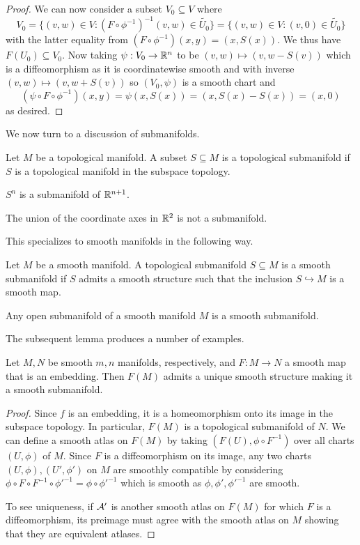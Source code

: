 \begin{proof}
    We can now consider a subset $V_{0}\subseteq V$ where 
    $$V_{0}=\{(v,w)\in V:(F\circ\phi^{-1})^{-1}(v,w)\in\widetilde{U_{0}}\}=\{(v,w)\in V:(v,0)\in\widetilde{U_{0}}\}$$
    with the latter equality from $(F\circ\phi^{-1})(x,y)=(x,S(x))$. We thus have $F(U_{0})\subseteq V_{0}$. Now taking $\psi:V_{0}\to\mathbb{R}^{n}$ to be $(v,w)\mapsto(v, w-S(v))$ which is a diffeomorphism as it is coordinatewise smooth and with inverse $(v,w)\mapsto(v,w+S(v))$ so $(V_{0},\psi)$ is a smooth chart and 
    $$(\psi\circ F\circ\phi^{-1})(x,y) = \psi(x, S(x)) = (x,S(x)-S(x))=(x,0)$$
    as desired.
\end{proof}
We now turn to a discussion of submanifolds. 
\begin{definition}[Submanifold]\label{def: submanifold}
    Let $M$ be a topological manifold. A subset $S\subseteq M$ is a topological submanifold if $S$ is a topological manifold in the subspace topology. 
\end{definition}
\begin{example}
    $S^{n}$ is a submanifold of $\mathbb{R}^{n+1}$. 
\end{example}
\begin{example}
    The union of the coordinate axes in $\mathbb{R}^{2}$ is not a submanifold. 
\end{example}
This specializes to smooth manifolds in the following way. 
\begin{definition}\label{def: smooth submanifold}
    Let $M$ be a smooth manifold. A topological submanifold $S\subseteq M$ is a smooth submanifold if $S$ admits a smooth structure such that the inclusion $S\hookrightarrow M$ is a smooth map. 
\end{definition}
\begin{remark}
    Any open submanifold of a smooth manifold $M$ is a smooth submanifold. 
\end{remark}
The subsequent lemma produces a number of examples. 
\begin{lemma}\label{lem: smooth submanifold recipe}
    Let $M,N$ be smooth $m,n$ manifolds, respectively, and $F:M\to N$ a smooth map that is an embedding. Then $F(M)$ admits a unique smooth structure making it a smooth submanifold. 
\end{lemma}
\begin{proof}
    Since $f$ is an embedding, it is a homeomorphism onto its image in the subspace topology. In particular, $F(M)$ is a topological submanifold of $N$. We can define a smooth atlas on $F(M)$ by taking $(F(U),\phi\circ F^{-1})$ over all charts $(U,\phi)$ of $M$. Since $F$ is a diffeomorphism on its image, any two charts $(U,\phi),(U',\phi')$ on $M$ are smoothly compatible by considering $\phi\circ F\circ F^{-1}\circ\phi'^{-1}=\phi\circ\phi'^{-1}$ which is smooth as $\phi,\phi',\phi'^{-1}$ are smooth.

    To see uniqueness, if $\mathcal{A}'$ is another smooth atlas on $F(M)$ for which $F$ is a diffeomorphism, its preimage must agree with the smooth atlas on $M$ showing that they are equivalent atlases. 
\end{proof}

